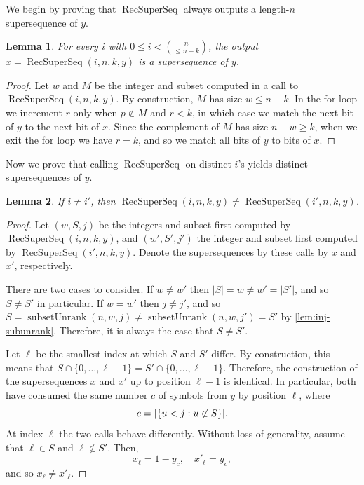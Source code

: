\documentclass[11pt]{article}
\newcommand{\recsuper}{\operatorname{RecSuperSeq}}
\newcommand{\subunrank}{\operatorname{subsetUnrank}}
\newtheorem{lemma}{Lemma}
\let\originalleft\left
\let\originalright\right
\renewcommand{\left}{\mathopen{}\mathclose\bgroup\originalleft}
\renewcommand{\right}{\aftergroup\egroup\originalright}
\begin{document}
We begin by proving that $\recsuper$ always outputs a length-$n$ supersequence of $y$.
\begin{lemma}\label{lem:correctness}
For every $i$ with $0\le i < \binom{n}{\leq n-k}$, the output $x=\recsuper(i,n,k,y)$ is a supersequence of $y$.
\end{lemma}
\begin{proof}
Let $w$ and $M$ be the integer and subset computed in a call to $\recsuper(i,n,k,y)$.
By construction, $M$ has size $w\le n-k$.
In the for loop we increment $r$ only when $p\not\in M$ and $r<k$, in which case we match the next bit of $y$ to the next bit of $x$.
Since the complement of $M$ has size $n-w\geq k$, when we exit the for loop we have $r=k$, and so we match all bits of $y$ to bits of $x$.
\end{proof}

Now we prove that calling $\recsuper$ on distinct $i$'s yields distinct supersequences of $y$.
\begin{lemma}
\label{lem:decode_superseq}
If $i\neq i'$, then $\recsuper(i,n,k,y)\neq\recsuper(i',n,k,y)$.
\end{lemma}
\begin{proof}
Let $(w,S,j)$ be the integers and subset first computed by $\recsuper(i,n,k,y)$, and $(w',S',j')$ the integer and subset first computed by $\recsuper(i',n,k,y)$.
Denote the supersequences by these calls by $x$ and $x'$, respectively.

There are two cases to consider.
If $w\neq w'$ then $|S|=w\neq w'=|S'|$, and so $S\neq S'$ in particular.
If $w=w'$ then $j\neq j'$, and so $S=\subunrank(n,w,j)\neq \subunrank(n,w,j')=S'$ by \cref{lem:inj-subunrank}.
Therefore, it is always the case that $S\neq S'$.

Let $\ell$ be the smallest index at which $S$ and $S'$ differ.
By construction, this means that $S\cap\{0,\dots,\ell-1\}=S'\cap\{0,\dots,\ell-1\}$.
Therefore, the construction of the supersequences $x$ and $x'$ up to position $\ell-1$ is identical.
In particular, both have consumed the same number $c$ of symbols from $y$ by position $\ell$, where
\begin{equation*}
    c = \left|\{u<j: u\not\in S\}\right|.
\end{equation*}
At index $\ell$ the two calls behave differently.
Without loss of generality, assume that $\ell\in S$ and $\ell\not\in S'$.
Then,
\begin{equation*}
    x_\ell = 1 - y_c,\quad x'_\ell = y_c,
\end{equation*}
and so $x_\ell\neq x'_\ell$.
\end{proof}
\end{document}
